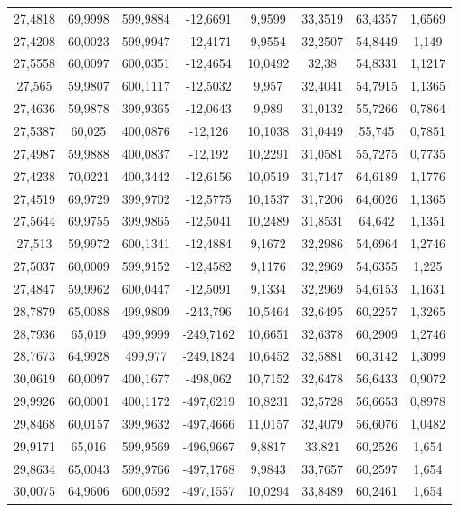 \begin{longtable}{@{}cccccccc@{}}
27,4818 & 69,9998 & 599,9884 & -12,6691 & 9,9599 & 33,3519 & 63,4357 & 1,6569 \\
27,4208 & 60,0023 & 599,9947 & -12,4171 & 9,9554 & 32,2507 & 54,8449 & 1,149 \\
27,5558 & 60,0097 & 600,0351 & -12,4654 & 10,0492 & 32,38 & 54,8331 & 1,1217 \\
27,565 & 59,9807 & 600,1117 & -12,5032 & 9,957 & 32,4041 & 54,7915 & 1,1365 \\
27,4636 & 59,9878 & 399,9365 & -12,0643 & 9,989 & 31,0132 & 55,7266 & 0,7864 \\
27,5387 & 60,025 & 400,0876 & -12,126 & 10,1038 & 31,0449 & 55,745 & 0,7851 \\
27,4987 & 59,9888 & 400,0837 & -12,192 & 10,2291 & 31,0581 & 55,7275 & 0,7735 \\
27,4238 & 70,0221 & 400,3442 & -12,6156 & 10,0519 & 31,7147 & 64,6189 & 1,1776 \\
27,4519 & 69,9729 & 399,9702 & -12,5775 & 10,1537 & 31,7206 & 64,6026 & 1,1365 \\
27,5644 & 69,9755 & 399,9865 & -12,5041 & 10,2489 & 31,8531 & 64,642 & 1,1351 \\
27,513 & 59,9972 & 600,1341 & -12,4884 & 9,1672 & 32,2986 & 54,6964 & 1,2746 \\
27,5037 & 60,0009 & 599,9152 & -12,4582 & 9,1176 & 32,2969 & 54,6355 & 1,225 \\
27,4847 & 59,9962 & 600,0447 & -12,5091 & 9,1334 & 32,2969 & 54,6153 & 1,1631 \\
28,7879 & 65,0088 & 499,9809 & -243,796 & 10,5464 & 32,6495 & 60,2257 & 1,3265 \\
28,7936 & 65,019 & 499,9999 & -249,7162 & 10,6651 & 32,6378 & 60,2909 & 1,2746 \\
28,7673 & 64,9928 & 499,977 & -249,1824 & 10,6452 & 32,5881 & 60,3142 & 1,3099 \\
30,0619 & 60,0097 & 400,1677 & -498,062 & 10,7152 & 32,6478 & 56,6433 & 0,9072 \\
29,9926 & 60,0001 & 400,1172 & -497,6219 & 10,8231 & 32,5728 & 56,6653 & 0,8978 \\
29,8468 & 60,0157 & 399,9632 & -497,4666 & 11,0157 & 32,4079 & 56,6076 & 1,0482 \\
29,9171 & 65,016 & 599,9569 & -496,9667 & 9,8817 & 33,821 & 60,2526 & 1,654 \\
29,8634 & 65,0043 & 599,9766 & -497,1768 & 9,9843 & 33,7657 & 60,2597 & 1,654 \\
30,0075 & 64,9606 & 600,0592 & -497,1557 & 10,0294 & 33,8489 & 60,2461 & 1,654 \\

\end{longtable}
